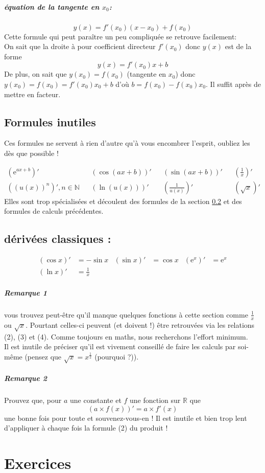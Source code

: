 \documentclass[11pt]{article}
\newcommand{\R}{\mathbb R}
\newcommand{\de}[1]{\left(#1\right)'}
\newcommand{\e}[1]{\mathrm{e}^{#1}}
\begin{document}
        \subparagraph{équation de la tangente en $x_0$:}
        \begin{equation*}
            y(x)=f'(x_0)(x-x_0) +f(x_0) 
        \end{equation*}
        Cette formule qui peut paraître un peu compliquée se retrouve facilement:\\
        On sait que la droite à pour coefficient directeur $f'(x_0)$ donc $y(x)$ est de la forme
        \begin{equation*}
            y(x)=f'(x_0)x+b
        \end{equation*}
        De plus, on sait que $y(x_0)=f(x_0)$ (tangente en $x_0$) donc $y(x_0)=f(x_0)= f'(x_0)x_0 +b$ d'où $b=f(x_0) -f(x_0)x_0$. Il suffit après de mettre en facteur.

        \subsection{Formules inutiles}
        Ces formules ne servent à rien d'autre qu'à vous encombrer l'esprit, oubliez les dès que possible !

        \begin{align*}
            \de{\e{ax+b}} && \de{\cos(ax+b)} && \de{\sin(ax+b)} && \de{\frac{1}{x}}\\
            \de{(u(x))^n}, n\in\mathbb{N} && \de{\ln(u(x))} && \de{\frac{1}{u(x)}} && \de{\sqrt{x}}
        \end{align*}
        Elles sont trop spécialisées et découlent des formules de la section \ref{derClassiques} et des formules de calculs précédentes.

        \subsection{dérivées classiques :} \label{derClassiques}
        \begin{align*}
            \de{\cos{x}} &= -\sin{x} &\de{\sin{x}} &= \cos{x} & \de{\e{x}} &= \e{x} \\
            \de{\ln{x}} &= \frac{1}{x} 
        \end{align*}
        \subparagraph{Remarque 1} vous trouvez peut-être qu'il manque quelques fonctions à cette section comme $\frac{1}{x}$ ou $\sqrt{x}$. Pourtant celles-ci peuvent (et doivent !) être retrouvées via les relations (2), (3) et (4). Comme toujours en maths, nous recherchons l'effort minimum.\\
        Il est inutile de préciser qu'il est vivement conseillé de faire les calculs par soi-même (pensez que $\sqrt{x} = x^{\frac{1}{2}}$ (pourquoi ?)).
        \subparagraph{Remarque 2} Prouvez que, pour $a$ une constante et $f$ une fonction sur $\R$ que
        \begin{equation*}
         \de{a\times f(x)} = a\times f'(x)
        \end{equation*}
         une bonne fois pour toute et souvenez-vous-en ! Il est inutile et bien trop lent d'appliquer à chaque fois la formule (2) du produit !  

    \section{Exercices}
\end{document}
